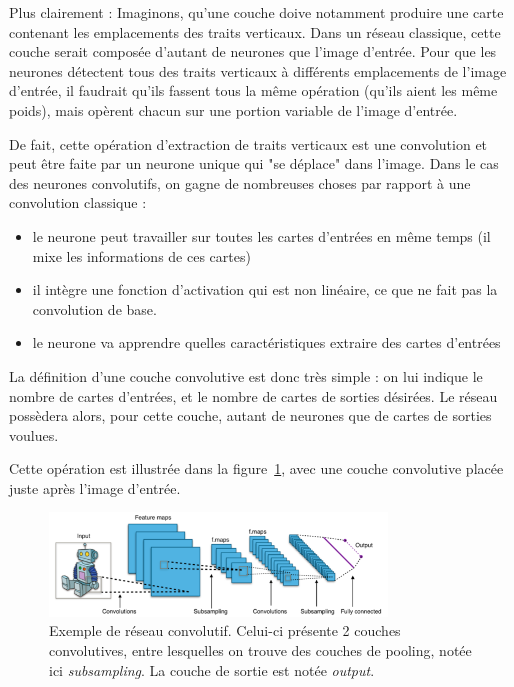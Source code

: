 Plus clairement : Imaginons, qu'une couche doive notamment produire une carte
contenant les emplacements des traits verticaux. Dans un réseau classique,
cette couche serait composée d'autant de neurones que l'image d'entrée.
Pour que les neurones détectent tous des traits verticaux à différents
emplacements de l'image d'entrée, il faudrait qu'ils fassent tous la même
opération (qu'ils aient les même poids), mais opèrent chacun sur une portion variable de l'image d'entrée.

De fait, cette opération d'extraction de traits verticaux est une convolution
et peut être faite par un neurone unique qui "se déplace" dans l'image.
Dans le cas des neurones convolutifs, on gagne de nombreuses choses par rapport
à une convolution classique :
\begin{itemize}
\item le neurone peut travailler sur toutes les cartes d'entrées en même temps
(il mixe les informations de ces cartes)
\item il intègre une fonction d'activation qui est non linéaire, ce que ne fait
pas la convolution de base.
\item le neurone va apprendre quelles caractéristiques extraire des cartes
d'entrées
\end{itemize}

La définition d'une couche convolutive est donc très simple :
on lui indique le nombre de cartes d'entrées, et le nombre de cartes de sorties
désirées. Le réseau possèdera alors, pour cette couche, autant de neurones
que de cartes de sorties voulues.

Cette opération est illustrée dans la figure~\ref{fig:exCNN}, avec une couche
convolutive placée juste après l'image d'entrée.

\begin{figure}[h!]
\centering
\includegraphics[width=0.8\textwidth]{./images/exCNN.png}
\caption[Exemple de réseau convolutif]{ Exemple de réseau convolutif. Celui-ci présente 2 couches convolutives, entre lesquelles on trouve des couches de
pooling, notée ici \textit{subsampling}. La couche de sortie est notée \textit{output}.
\label{fig:exCNN}
}
\end{figure}

